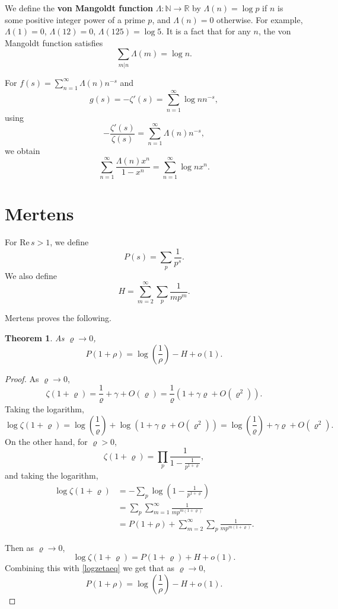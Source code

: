 \documentclass{amsart}
\def\Re{\ensuremath{\mathrm{Re}}\,}
\newtheorem{theorem}{Theorem}
\begin{document}
We define the \textbf{von Mangoldt function} $\Lambda:\mathbb{N} \to \mathbb{R}$ by
$\Lambda(n)=\log p$ if $n$ is some positive integer power of a prime $p$, and $\Lambda(n)=0$ otherwise. For example,
$\Lambda(1)=0$, $\Lambda(12)=0$, $\Lambda(125)=\log 5$. It is a fact \cite[p.~254, Theorem 296]{wright} that for any $n$, the von Mangoldt function satisfies
\begin{equation}
\sum_{m | n} \Lambda(m) = \log n.
\label{mangoldtsum}
\end{equation}

For $f(s)=\sum_{n=1}^\infty \Lambda(n) n^{-s}$ and
\[
g(s) = -\zeta'(s) = \sum_{n=1}^\infty \log n n^{-s},
\]
using \cite[p.~253, Theorem 294]{wright}
\[
-\frac{\zeta'(s)}{\zeta(s)} = \sum_{n=1}^\infty \Lambda(n) n^{-s},
\]
we obtain
\[
\sum_{n=1}^\infty \frac{\Lambda(n) x^n}{1-x^n} = \sum_{n=1}^\infty \log n x^n.
\]



\section{Mertens}
For $\Re s>1$, we define
\[
P(s) = \sum_p \frac{1}{p^s}.
\]
We also 
define
\[
H = \sum_{m=2}^\infty \sum_p \frac{1}{mp^m}.
\]

Mertens \cite{mertens} proves the following.

\begin{theorem}
As $\varrho \to 0$,
\[
P(1+\rho) = \log \left( \frac{1}{\rho} \right)-H+o(1).
\]
\end{theorem}
\begin{proof}
As $\varrho \to 0$,
\[
\zeta(1+\varrho) = \frac{1}{\varrho}+\gamma+O(\varrho) = \frac{1}{\varrho}(1+\gamma \varrho + O(\varrho^2)).
\]
Taking the logarithm,
\begin{equation}
\log \zeta(1+\varrho) = \log \left(\frac{1}{\varrho} \right) + \log(1+\gamma \varrho + O(\varrho^2))
= \log \left(\frac{1}{\varrho} \right)  + \gamma \varrho+O(\varrho^2).
\label{logzetaeq}
\end{equation}
On the other hand, for $\varrho>0$,
\[
\zeta(1+\varrho) = \prod_p \frac{1}{1-\frac{1}{p^{1+\varrho}}},
\]
and taking the logarithm,
\begin{align*}
\log \zeta(1+\varrho) &= -  \sum_p \log\left(1-\frac{1}{p^{1+\varrho}}\right)\\
&=\sum_p \sum_{m=1}^\infty \frac{1}{mp^{m(1+\varrho)}}\\
&=P(1+\rho) + \sum_{m=2}^\infty \sum_p  \frac{1}{mp^{m(1+\varrho)}}.
\end{align*}

Then as $\varrho \to 0$,
\[
\log \zeta(1+\varrho)  = P(1+\varrho) + H + o(1).
\]
Combining this with \eqref{logzetaeq} we get that as $\varrho \to 0$,
\[
P(1+\rho) = \log \left( \frac{1}{\rho} \right)-H+o(1).
\]
\end{proof}
\end{document}
